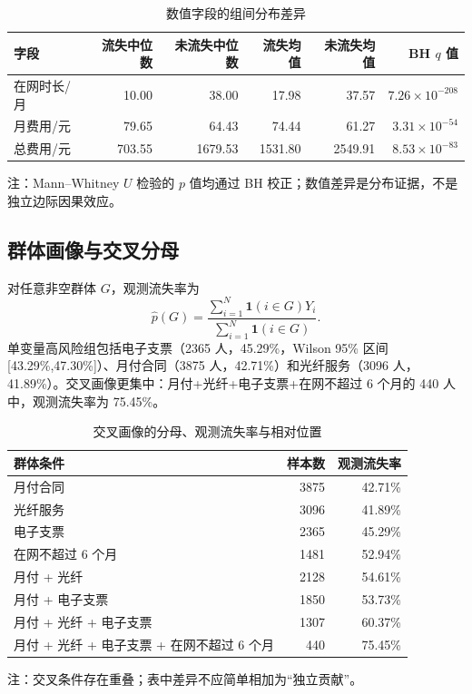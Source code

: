 \documentclass[UTF8,a4paper,11pt]{ctexart}
\begin{document}
\begin{table}[H]
\centering
\caption{数值字段的组间分布差异}
\label{tab:q1-num-v2}
\begin{tabular}{@{}lrrrrr@{}}
\toprule
字段&流失中位数&未流失中位数&流失均值&未流失均值&BH \(q\) 值\\
\midrule
在网时长/月&10.00&38.00&17.98&37.57&\(7.26\times10^{-208}\)\\
月费用/元&79.65&64.43&74.44&61.27&\(3.31\times10^{-54}\)\\
总费用/元&703.55&1679.53&1531.80&2549.91&\(8.53\times10^{-83}\)\\
\bottomrule
\end{tabular}
\begin{tablenotes}
\footnotesize\item 注：Mann--Whitney \(U\) 检验的 \(p\) 值均通过 BH 校正；数值差异是分布证据，不是独立边际因果效应。
\end{tablenotes}
\end{table}

\subsection{群体画像与交叉分母}
对任意非空群体 \(G\)，观测流失率为
\begin{equation}
\widehat p(G)=\frac{\sum_{i=1}^{N}\mathbf 1(i\in G)Y_i}{\sum_{i=1}^{N}\mathbf 1(i\in G)}.
\label{eq:group-rate-v2}
\end{equation}
单变量高风险组包括电子支票（2365 人，45.29\%，Wilson 95\% 区间 [43.29\%,47.30\%]）、月付合同（3875 人，42.71\%）和光纤服务（3096 人，41.89\%）。交叉画像更集中：月付+光纤+电子支票+在网不超过 6 个月的 440 人中，观测流失率为 75.45\%。

\begin{table}[H]
\centering
\caption{交叉画像的分母、观测流失率与相对位置}
\label{tab:q1-inter-v2}
\begin{tabular}{@{}lrr@{}}
\toprule
群体条件&样本数&观测流失率\\
\midrule
月付合同&3875&42.71\%\\
光纤服务&3096&41.89\%\\
电子支票&2365&45.29\%\\
在网不超过 6 个月&1481&52.94\%\\
月付 + 光纤&2128&54.61\%\\
月付 + 电子支票&1850&53.73\%\\
月付 + 光纤 + 电子支票&1307&60.37\%\\
月付 + 光纤 + 电子支票 + 在网不超过 6 个月&440&75.45\%\\
\bottomrule
\end{tabular}
\begin{tablenotes}
\footnotesize\item 注：交叉条件存在重叠；表中差异不应简单相加为“独立贡献”。
\end{tablenotes}
\end{table}
\end{document}
